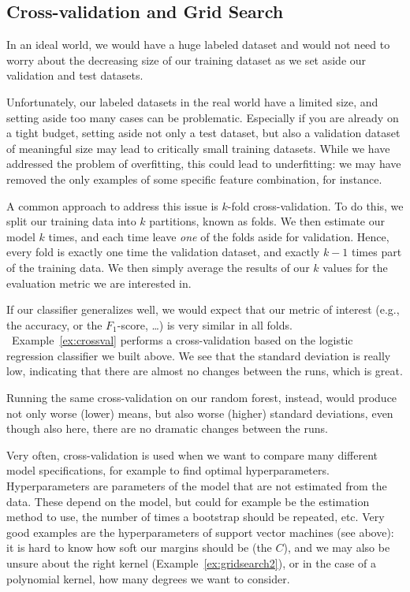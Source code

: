 \subsection{Cross-validation and Grid Search} \label{sec:crossvalidation}

In an ideal world, we would have a huge labeled dataset and would not
need to worry about the decreasing size of our training dataset as we
set aside our validation and test datasets.

Unfortunately, our labeled datasets in the real world have a limited
size, and setting aside too many cases can be problematic. Especially
if you are already on a tight budget, setting aside not only a test
dataset, but also a validation dataset of meaningful size may lead to
critically small training datasets. While we have addressed the
problem of overfitting, this could lead to underfitting: we may have
removed the only examples of some specific feature combination, for
instance.

A common approach to address this issue is $k$-fold
cross-validation. To do this, we split our training data into $k$ partitions,
known as folds. We then estimate our model $k$ times, and each time
leave \emph{one} of the folds aside for validation. Hence, every fold
is exactly one time the validation dataset, and exactly $k-1$ times
part of the training data. We then simply average the results of our
$k$ values for the evaluation metric we are interested in.

If our classifier generalizes well, we would expect that our metric of
interest (e.g., the accuracy, or the $F_1$-score, \ldots) is very similar
in all folds. ~Example~\ref{ex:crossval} performs a cross-validation based on
the logistic regression classifier we built above. We see that the
standard deviation is really low, indicating that there are almost no
changes between the runs, which is great.

Running the same cross-validation on our random forest, instead, would
produce not only worse (lower) means, but also worse (higher) standard
deviations, even though also here, there are no dramatic changes
between the runs.


Very often, cross-validation is used when we want to compare many
different model specifications, for example to find optimal
hyperparameters.
Hyperparameters are parameters of the model that are not estimated
from the data. These depend on the model, but could for example be the
estimation method to use, the number of times a bootstrap should be
repeated, etc. Very good examples are the hyperparameters of support
vector machines (see above): it is hard to know how soft our margins
should be (the $C$), and we may also be unsure about the right kernel
(Example~\ref{ex:gridsearch2}), or in the case of a polynomial kernel, how many
degrees we want to consider.

